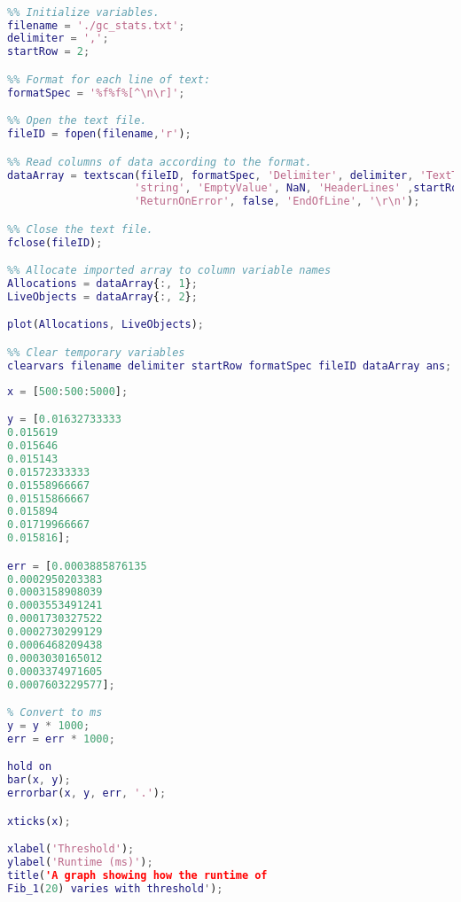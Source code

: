 \documentclass[12pt,a4paper,twoside,openright]{report}
\begin{document}
\begin{figure*}
\begin{lstlisting}[language=Matlab, caption=The script used to produce graphs from the Logger output, label={lst:loggeroutputgraph}]
%% Import data from text file.

%% Initialize variables.
filename = './gc_stats.txt';
delimiter = ',';
startRow = 2;

%% Format for each line of text:
formatSpec = '%f%f%[^\n\r]';

%% Open the text file.
fileID = fopen(filename,'r');

%% Read columns of data according to the format.
dataArray = textscan(fileID, formatSpec, 'Delimiter', delimiter, 'TextType', 
                    'string', 'EmptyValue', NaN, 'HeaderLines' ,startRow-1, 
                    'ReturnOnError', false, 'EndOfLine', '\r\n');

%% Close the text file.
fclose(fileID);

%% Allocate imported array to column variable names
Allocations = dataArray{:, 1};
LiveObjects = dataArray{:, 2};

plot(Allocations, LiveObjects);

%% Clear temporary variables
clearvars filename delimiter startRow formatSpec fileID dataArray ans;
\end{lstlisting}
\end{figure*}

\begin{figure*}
\begin{lstlisting}[language=Matlab, caption=Matlab script for Fib runtime graph w.r.t. threshold, label={lst:fibbenchthresh}]
x = [500:500:5000];

y = [0.01632733333
0.015619
0.015646
0.015143
0.01572333333
0.01558966667
0.01515866667
0.015894
0.01719966667
0.015816];

err = [0.0003885876135
0.0002950203383
0.0003158908039
0.0003553491241
0.0001730327522
0.0002730299129
0.0006468209438
0.0003030165012
0.0003374971605
0.0007603229577];

% Convert to ms
y = y * 1000;
err = err * 1000;

hold on
bar(x, y);
errorbar(x, y, err, '.');

xticks(x);

xlabel('Threshold');
ylabel('Runtime (ms)');
title('A graph showing how the runtime of 
Fib_1(20) varies with threshold');
\end{lstlisting}
\end{figure*}
\end{document}
